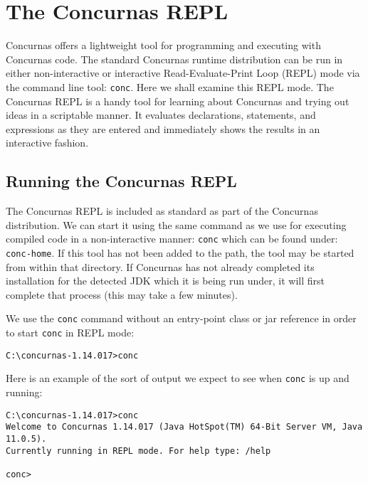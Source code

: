 \documentclass[conc-doc]{subfiles}
\begin{document}
	\chapter[The Concurnas REPL]{The Concurnas REPL}
	\label{ch:repl}

Concurnas offers a lightweight tool for programming and executing with Concurnas code. The standard Concurnas runtime distribution can be run in either non-interactive or interactive Read-Evaluate-Print Loop (REPL) mode via the command line tool: \lstinline[language=None]{conc}. Here we shall examine this REPL mode. The Concurnas REPL is a handy tool for learning about Concurnas and trying out ideas in a scriptable manner. It evaluates declarations, statements, and expressions as they are entered and immediately shows the results in an interactive fashion.	

\section{Running the Concurnas REPL}
The Concurnas REPL is included as standard as part of the Concurnas distribution. We can start it using the same command as we use for executing compiled code in a non-interactive manner: \lstinline[language=None]{conc} which can be found under: \lstinline[language=None]{conc-home}. If this tool has not been added to the path, the tool may be started from within that directory. If Concurnas has not already completed its installation for the detected JDK which it is being run under, it will first complete that process (this may take a few minutes).

We use the \lstinline[language=None]{conc} command without an entry-point class or jar reference in order to start \lstinline[language=None]{conc} in REPL mode:

\begin{lstlisting}[language=None]
C:\concurnas-1.14.017>conc
\end{lstlisting}

Here is an example of the sort of output we expect to see when \lstinline[language=None]{conc} is up and running:

\begin{lstlisting}[language=None]
C:\concurnas-1.14.017>conc
Welcome to Concurnas 1.14.017 (Java HotSpot(TM) 64-Bit Server VM, Java 11.0.5).
Currently running in REPL mode. For help type: /help

conc> 
\end{lstlisting}
\end{document}
